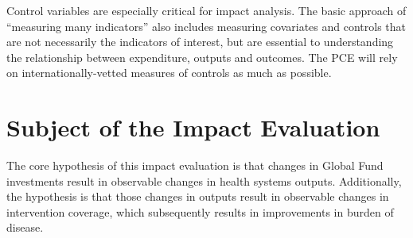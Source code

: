 \documentclass[twocolumn]{bmcart}%
\begin{document}
Control variables are especially critical for impact analysis. The basic approach of ``measuring many indicators'' also includes measuring covariates and controls that are not necessarily the indicators of interest, but are essential to understanding the relationship between expenditure, outputs and outcomes. The PCE will rely on internationally-vetted measures of controls as much as possible. \\









\section{Subject of the Impact Evaluation} \label{hypothesis}

The core hypothesis of this impact evaluation is that changes in Global Fund investments result in observable changes in health systems outputs. Additionally, the hypothesis is that those changes in outputs result in observable changes in intervention coverage, which subsequently results in improvements in burden of disease. \\
\end{document}

